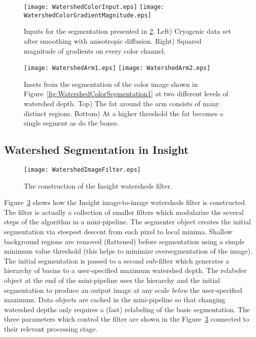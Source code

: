 \begin{figure}
\centering
\texttt{[image: WatershedColorInput.eps]}
\texttt{[image: WatershedColorGradientMagnitude.eps]}
\caption[Watershed segmentation inputs]{ Inputs for the segmentation presented
in \ref{fig:WatershedColorSegmentation3}.  Left) Cryogenic data set after
smoothing with anisotropic diffusion.  Right) Squared magnitude of gradients on
every color channel.}
\protect\label{fig:WatershedColorInput}
\end{figure}

\begin{figure}
\centering
\texttt{[image: WatershedArm1.eps]}
\texttt{[image: WatershedArm2.eps]}
\caption[Watershed segmentation output at two levels]{
Insets from the segmentation of the color image shown in 
Figure~\protect\ref{fig:WatershedColorSegmentation1} at two different levels of 
watershed depth.  Top) The fat around the arm consists of many 
distinct regions.  Bottom) At a higher threshold the 
fat becomes a single segment as do the bones.
}
\protect\label{fig:WatershedColorSegmentation3}
\end{figure}
\subsection{Watershed Segmentation in Insight}
\label{sec:ImplementationWatersheds}

\begin{figure}
\centering
\texttt{[image: WatershedImageFilter.eps]}
\caption{The construction of the Insight watersheds filter.}
\protect\label{fig:constructionWatersheds}
\end{figure}

Figure~\ref{fig:constructionWatersheds} shows how the Insight image-to-image
watersheds filter is constructed.  The filter is actually a collection of
smaller filters which modularize the several steps of the algorithm in a
mini-pipeline.  The segmenter object creates the initial segmentation via
steepest descent from each pixel to local minima. Shallow background regions
are removed (flattened) before segmentation using a simple minimum value
threshold (this helps to minimize oversegmentation of the image).  The initial
segmentation is passed to a second sub-filter which generates a hierarchy of
basins to a user-specified maximum watershed depth.  The relabeler object at
the end of the mini-pipeline uses the hierarchy and the initial segmentation to
produce an output image at any scale {\em below} the user-specified maximum.
Data objects are cached in the mini-pipeline so that changing watershed depths
only requires a (fast) relabeling of the basic segmentation.  The three
parameters which control the filter are shown in the
Figure~\ref{fig:constructionWatersheds} connected to their relevant processing
stage.

